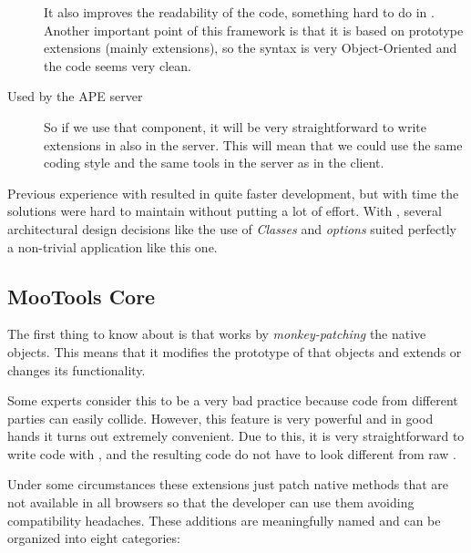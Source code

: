 \begin{description}
  It also improves the readability of the code, something hard to do in .
  Another important point of this framework is that it is based on prototype extensions (mainly  extensions), so the syntax is very Object-Oriented and the code seems very clean.

  \item[Used by the \ac{APE} server\index{APE server}]
  So if we use that component, it will be very straightforward to write extensions in  also in the server.
  This will mean that we could use the same coding style and the same tools in the server as in the client.

\end{description}

Previous experience with  resulted in quite faster development, but with time the solutions were hard to maintain without putting a lot of effort.
With , several architectural design decisions like the use of \emph{Classes} and \emph{options} suited perfectly a non-trivial application like this one.


\subsection{MooTools Core} %
\label{sub:mootools_core}

The first thing to know about  is that works by \emph{monkey-patching} the native objects.
This means that it modifies the prototype of that objects and extends or changes its functionality.

Some experts consider this to be a very bad practice because code from different parties can easily collide.
However, this  feature is very powerful and in good hands it turns out extremely convenient.
Due to this, it is very straightforward to write code with , and the resulting code do not have to look different from raw .

Under some circumstances these extensions just patch native methods that are not available in all browsers so that the developer can use them avoiding compatibility headaches.
These additions are meaningfully named and can be organized into eight categories:

